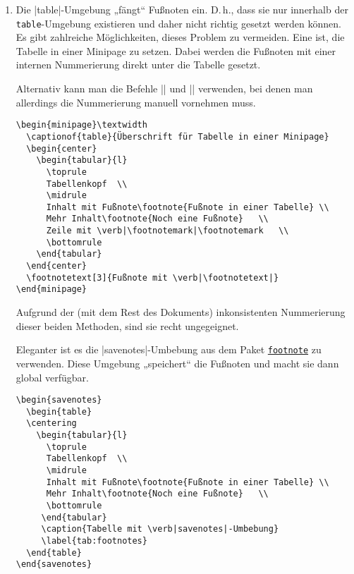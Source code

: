 \documentclass{scrartcl}
\newcommand{\pkg}[1]{\href{http://ctan.org/pkg/#1}{\texttt{#1}}}
\begin{document}
\newsavebox{\SolutionCodeE}
\begin{lrbox}{\SolutionCodeE}
\begin{minipage}{\textwidth}
\begin{enumerate}[label=\alph*)]\addtocounter{enumi}{4}
\item Die |table|-Umgebung „fängt“ Fußnoten ein. D.\,h., dass sie nur innerhalb der \verb|table|-Umgebung existieren und daher nicht richtig gesetzt werden können.
Es gibt zahlreiche Möglichkeiten, dieses Problem zu vermeiden. Eine ist, die Tabelle in einer Minipage zu setzen. Dabei werden die Fußnoten mit einer internen Nummerierung direkt unter die Tabelle gesetzt.

Alternativ kann man die Befehle |\footnotemark| und |\footnotetext| verwenden, bei denen man allerdings die Nummerierung manuell vornehmen muss.

\begin{lstlisting}
\begin{minipage}\textwidth
  \captionof{table}{Überschrift für Tabelle in einer Minipage}
  \begin{center}
    \begin{tabular}{l}
      \toprule
      Tabellenkopf	\\
      \midrule
      Inhalt mit Fußnote\footnote{Fußnote in einer Tabelle}	\\
      Mehr Inhalt\footnote{Noch eine Fußnote}	\\
      Zeile mit \verb|\footnotemark|\footnotemark	\\
      \bottomrule
    \end{tabular}
  \end{center}
  \footnotetext[3]{Fußnote mit \verb|\footnotetext|}
\end{minipage}
\end{lstlisting}

Aufgrund der (mit dem Rest des Dokuments) inkonsistenten Nummerierung dieser beiden Methoden, sind sie recht ungegeignet.



Eleganter ist es die |savenotes|-Umbebung aus dem Paket \pkg{footnote} zu verwenden. Diese Umgebung „speichert“ die Fußnoten und macht sie dann global verfügbar.
\begin{lstlisting}
\begin{savenotes}
  \begin{table}
  \centering
    \begin{tabular}{l}
      \toprule
      Tabellenkopf  \\
      \midrule
      Inhalt mit Fußnote\footnote{Fußnote in einer Tabelle} \\
      Mehr Inhalt\footnote{Noch eine Fußnote}	\\
      \bottomrule
	 \end{tabular}
	 \caption{Tabelle mit \verb|savenotes|-Umbebung}
	 \label{tab:footnotes}
  \end{table}
\end{savenotes}
\end{lstlisting}
\end{enumerate}
\end{minipage}
\end{lrbox}
\end{document}

